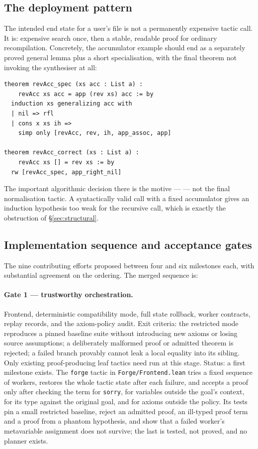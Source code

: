 \subsection{The deployment pattern}

The intended end state for a user's file is not a permanently expensive tactic
call. It is: expensive search once, then a stable, readable proof for ordinary
recompilation. Concretely, the accumulator example should end as a separately
proved general lemma plus a short specialisation, with the final theorem not
invoking the synthesiser at all:

\begin{lstlisting}
theorem revAcc_spec (xs acc : List a) :
    revAcc xs acc = app (rev xs) acc := by
  induction xs generalizing acc with
  | nil => rfl
  | cons x xs ih =>
    simp only [revAcc, rev, ih, app_assoc, app]

theorem revAcc_correct (xs : List a) :
    revAcc xs [] = rev xs := by
  rw [revAcc_spec, app_right_nil]
\end{lstlisting}

The important algorithmic decision there is the motive ---  --- not the final normalisation tactic. A syntactically valid 
call with a fixed accumulator gives an induction hypothesis too weak for the
recursive call, which is exactly the obstruction of \S\ref{sec:structural}.

\subsection{Implementation sequence and acceptance gates}

The nine contributing efforts proposed between four and six milestones each,
with substantial agreement on the ordering. The merged sequence is:

\paragraph{Gate 1 --- trustworthy orchestration.}
Frontend, deterministic compatibility mode, full state rollback, worker
contracts, replay records, and the axiom-policy audit. Exit criteria: the
restricted mode reproduces a pinned baseline suite without introducing new
axioms or losing source assumptions; a deliberately malformed proof or admitted
theorem is rejected; a failed branch provably cannot leak a local equality into
its sibling. Only existing proof-producing leaf tactics need run at this stage.
Status: a first milestone exists. The \texttt{forge} tactic in
\texttt{Forge/Frontend.lean} tries a fixed sequence of workers, restores the whole
tactic state after each failure, and accepts a proof only after checking the term
for \texttt{sorry}, for variables outside the goal's context, for its type
against the original goal, and for axioms outside the policy. Its tests pin a
small restricted baseline, reject an admitted proof, an ill-typed proof term
and a proof from a phantom hypothesis, and show that a failed worker's
metavariable assignment does not survive; the last is tested, not proved, and
no planner exists.


